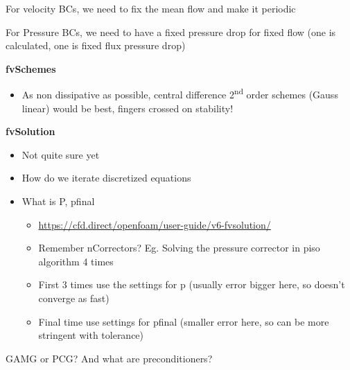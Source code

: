 \documentclass[12pt]{article}
\renewcommand{\_}{\kern-1.5pt\textunderscore\kern-1.5pt}
\begin{document}
For velocity BCs, we need to fix the mean flow and make it periodic\par

For Pressure BCs, we need to have a fixed pressure drop for fixed flow (one is calculated, one is fixed flux pressure drop)\par


\vspace{\baselineskip}
\textbf{fvSchemes}\par

\begin{itemize}
	\item As non dissipative as possible, central difference 2\textsuperscript{nd} order schemes (Gauss linear) would be best, fingers crossed on stability!\par

\end{itemize}
\textbf{fvSolution}\par
\begin{itemize}
	\item Not quite sure yet\par

	\item How do we iterate discretized equations\par

	\item What is P, pfinal\par
	\begin{itemize}
	\item \href{https://cfd.direct/openfoam/user-guide/v6-fvsolution/}{https://cfd.direct/openfoam/user-guide/v6-fvsolution/}\par

	\item Remember nCorrectors? Eg. Solving the pressure corrector in piso algorithm 4 times\par
\end{itemize}



\begin{itemize}
	\item First 3 times use the settings for p (usually error bigger here, so doesn’t converge as fast)\par

	\item Final time use settings for pfinal (smaller error here, so can be more stringent with tolerance)\par


\end{itemize}


\end{itemize}
GAMG or PCG? And what are preconditioners?\par
\end{document}

